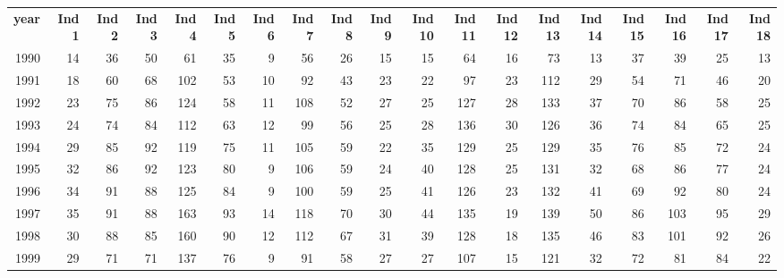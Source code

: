 \begin{tabular}{rrrrrrrrrrrrrrrrrrr}
  \hline
  \textbf{year} & \textbf{Ind 1} & \textbf{Ind 2} & \textbf{Ind 3} & \textbf{Ind 4} & \textbf{Ind 5} & \textbf{Ind 6} & \textbf{Ind 7} & \textbf{Ind 8} & \textbf{Ind 9} & \textbf{Ind 10} & \textbf{Ind 11} & \textbf{Ind 12} & \textbf{Ind 13} & \textbf{Ind 14} & \textbf{Ind 15} & \textbf{Ind 16} & \textbf{Ind 17} & \textbf{Ind 18} \\
  1990 & 14 & 36 & 50 & 61 & 35 & 9 & 56 & 26 & 15 & 15 & 64 & 16 & 73 & 13 & 37 & 39 & 25 & 13 \\
  1991 & 18 & 60 & 68 & 102 & 53 & 10 & 92 & 43 & 23 & 22 & 97 & 23 & 112 & 29 & 54 & 71 & 46 & 20 \\
  1992 & 23 & 75 & 86 & 124 & 58 & 11 & 108 & 52 & 27 & 25 & 127 & 28 & 133 & 37 & 70 & 86 & 58 & 25 \\
  1993 & 24 & 74 & 84 & 112 & 63 & 12 & 99 & 56 & 25 & 28 & 136 & 30 & 126 & 36 & 74 & 84 & 65 & 25 \\
  1994 & 29 & 85 & 92 & 119 & 75 & 11 & 105 & 59 & 22 & 35 & 129 & 25 & 129 & 35 & 76 & 85 & 72 & 24 \\
  1995 & 32 & 86 & 92 & 123 & 80 & 9 & 106 & 59 & 24 & 40 & 128 & 25 & 131 & 32 & 68 & 86 & 77 & 24 \\
  1996 & 34 & 91 & 88 & 125 & 84 & 9 & 100 & 59 & 25 & 41 & 126 & 23 & 132 & 41 & 69 & 92 & 80 & 24 \\
  1997 & 35 & 91 & 88 & 163 & 93 & 14 & 118 & 70 & 30 & 44 & 135 & 19 & 139 & 50 & 86 & 103 & 95 & 29 \\
  1998 & 30 & 88 & 85 & 160 & 90 & 12 & 112 & 67 & 31 & 39 & 128 & 18 & 135 & 46 & 83 & 101 & 92 & 26 \\
  1999 & 29 & 71 & 71 & 137 & 76 & 9 & 91 & 58 & 27 & 27 & 107 & 15 & 121 & 32 & 72 & 81 & 84 & 22 \\\hline
\end{tabular}
